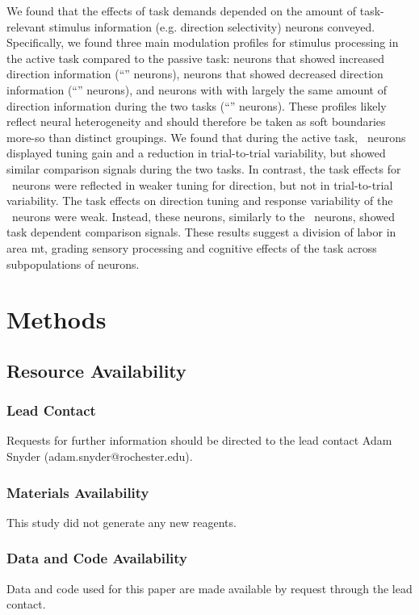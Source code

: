 We found that the effects of task demands depended on the amount of task-relevant stimulus information (e.g. direction selectivity) neurons conveyed. 
Specifically, we found three main modulation profiles for stimulus processing in the active task compared to the passive task: neurons that showed increased direction information (``\enhanced'' neurons), neurons that showed decreased direction information (``\suppressed'' neurons), and neurons with with largely the same amount of direction information during the two tasks (``\consistent'' neurons). These profiles likely reflect neural heterogeneity and should therefore be taken as soft boundaries more-so than distinct groupings.\label{rev:het1}
We found that during the active task, \enhanced\ neurons displayed tuning gain and a reduction in trial-to-trial variability, but showed similar comparison signals during the two tasks. 
In contrast, the task effects for \suppressed\ neurons were reflected in weaker tuning for direction, but not in trial-to-trial variability. 
The task effects on direction tuning and response variability of the \consistent\ neurons were weak. 
Instead, these neurons, similarly to the \suppressed\ neurons, showed task dependent comparison signals.
These results suggest a division of labor in area \gls{mt}, grading sensory processing and cognitive effects of the task across subpopulations of neurons.

\section*{\color{sectionBlue} Methods}
\label{sec:methods}

\subsection*{Resource Availability}
\subsubsection*{Lead Contact }
Requests for further information should be directed to the lead contact Adam Snyder (adam.snyder@rochester.edu).

\subsubsection*{Materials Availability }
This study did not generate any new reagents. 

\subsubsection*{Data and Code Availability}
Data and code used for this paper are made available by request through the lead contact.

